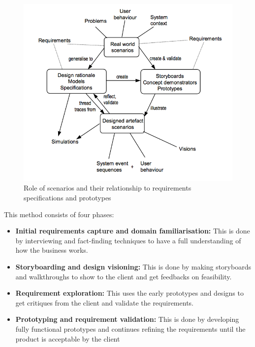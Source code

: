 \begin{figure}[h]
\centering
\includegraphics[scale=0.7]{fig/REscenario.png}
  \caption{Role of scenarios and their relationship to requirements specifications and prototypes}
\label{fig:REscenario}
\end{figure}


This method consists of four phases:
\begin{itemize}

\item \textbf{Initial requirements capture and domain familiarisation: } This is done by interviewing and fact-finding techniques to have a full understanding of how the business works.

\item \textbf{Storyboarding and design visioning: } This is done by making storyboards and walkthroughs to show to the client and get feedbacks on feasibility.

\item \textbf{Requirement exploration: } This uses the early prototypes  and designs to get critiques from the client and validate the requirements.

\item \textbf{Prototyping and requirement validation: } This is done by developing fully functional prototypes and continues refining the requirements until the product is acceptable by the client

\end{itemize}

